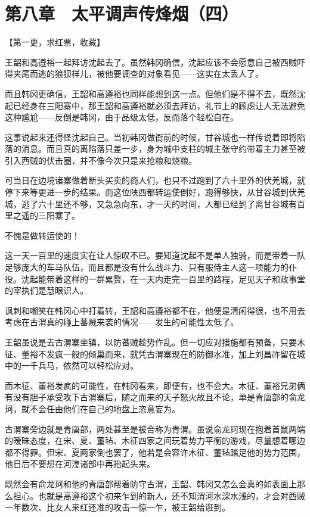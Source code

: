 \section{第八章　太平调声传烽烟（四）}

【第一更，求红票，收藏】

王韶和高遵裕一起拜访沈起去了。虽然韩冈确信，沈起应该不会愿意自己被西贼吓得夹尾而逃的狼狈样儿，被他要调查的对象看见——这实在太丢人了。

而且韩冈更确信，王韶和高遵裕也同样能想到这一点。但他们是不得不去，既然沈起已经身在三阳寨中，那王韶和高遵裕就必须去拜访，礼节上的顾虑让人无法避免这种尴尬——反倒是韩冈，由于品级太低，反而落个轻松自在。

这事说起来还得怪沈起自己。当初韩冈做衙前的时候，甘谷城也一样传说着即将陷落的消息。而且真的离陷落只差一步，身为城中支柱的城主张守约带着主力甚至被引入西贼的伏击圈，并不像今次只是来抢粮和烧粮。

可当日在边境诸寨做着断头买卖的商人们，也只不过跑到了六十里外的伏羌城，就停下来等更进一步的结果。而这位陕西都转运使倒好，跑得够快，从甘谷城到伏羌城，逃了六十里还不够，又急急向东，才一天的时间，人都已经到了离甘谷城有百里之遥的三阳寨了。

不愧是做转运使的！

这一天一百里的速度实在让人惊叹不已。要知道沈起不是单人独骑，而是带着一队足够庞大的车马队伍，而且都是没有什么战斗力、只有服侍主人这一项能力的仆役。沈起能带着这样的一群累赘，在一天内走完一百里的路程，足见天子和政事堂的宰执们是慧眼识人。

讽刺和嘲笑在韩冈心中打着转，王韶和高遵裕都不在，他便是清闲得很，也不用去考虑在古渭真的碰上蕃贼来袭的情况——发生的可能性太低了。

王韶虽说是去古渭寨坐镇，以防蕃贼趁势作乱。但一切应对措施都有预备，只要木征、董裕不发疯一般的倾巢而来，就凭古渭寨现在的防御水准，加上刘昌祚留在城中的一千兵马，依然可以轻松应对。

而木征、董裕发疯的可能性，在韩冈看来，即便有，也不会大。木征、董裕兄弟俩有没有胆子承受攻下古渭寨后，随之而来的天子怒火故且不论，单是青唐部的俞龙珂，就不会任由他们在自己的地盘上恣意妄为。

古渭寨旁边就是青唐部，两处甚至是被合称为青渭。虽说俞龙珂现在抱着首鼠两端的暧昧态度，在宋、夏、董毡、木征四家之间玩着势力平衡的游戏，尽量想着哪边都不得罪。但宋、夏两家倒也罢了，他若是会容许木征、董毡踏足他的势力范围，他日后不要想在河湟诸部中再抬起头来。

既然会有俞龙珂和他的青唐部帮着防守古渭，王韶、韩冈又怎么会真的如表面上那么担心。也就是高遵裕这个初来乍到的新人，还不知渭河水深水浅的，才会对西贼一年数次、比女人来红还准的攻击一惊一乍，被王韶给诳到。

